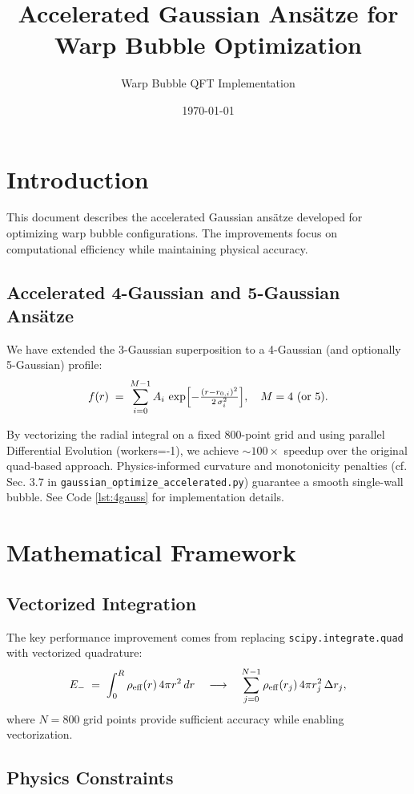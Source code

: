 \documentclass[12pt]{article}
\title{Accelerated Gaussian Ansätze for Warp Bubble Optimization}
\author{Warp Bubble QFT Implementation}
\date{\today}
\begin{document}
\maketitle

\section{Introduction}

This document describes the accelerated Gaussian ansätze developed for optimizing warp bubble configurations. The improvements focus on computational efficiency while maintaining physical accuracy.

\subsection{Accelerated 4-Gaussian and 5-Gaussian Ansätze}

We have extended the 3-Gaussian superposition to a 4-Gaussian (and optionally 5-Gaussian) profile:
\[
  f(r) \;=\; \sum_{i=0}^{M-1} A_i \,\exp\Bigl[-\tfrac{(r-r_{0,i})^2}{2\,\sigma_i^2}\Bigr], 
  \quad M=4\ (\text{or }5).
\]

By vectorizing the radial integral on a fixed 800-point grid and using parallel Differential Evolution (workers=-1), we achieve \(\sim100\times\) speedup over the original quad‐based approach. Physics-informed curvature and monotonicity penalties (cf. Sec. 3.7 in \texttt{gaussian_optimize_accelerated.py}) guarantee a smooth single-wall bubble. See Code \ref{lst:4gauss} for implementation details.

\section{Mathematical Framework}

\subsection{Vectorized Integration}

The key performance improvement comes from replacing \texttt{scipy.integrate.quad} with vectorized quadrature:
\[
  E_{-} \;=\; \int_0^R \rho_{\rm eff}(r)\,4\pi r^2 \,dr 
  \quad\longrightarrow\quad
  \sum_{j=0}^{N-1} \rho_{\rm eff}(r_j)\,4\pi r_j^2\,\Delta r_j,
\]
where \(N=800\) grid points provide sufficient accuracy while enabling vectorization.

\subsection{Physics Constraints}
\end{document}
